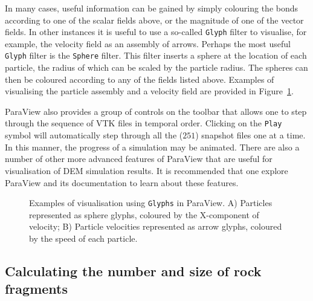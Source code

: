 In many cases, useful information can be gained by simply colouring the bonds according to one of the scalar fields above, or the magnitude of one of the vector fields. In other instances it is useful to use a so-called \texttt{Glyph} filter to visualise, for example, the velocity field as an assembly of arrows. Perhaps the most useful \texttt{Glyph} filter is the \texttt{Sphere} filter. This filter inserts a sphere at the location of each particle, the radius of which can be scaled by the particle radius. The spheres can then be coloured according to any of the fields listed above. Examples of visualising the particle assembly and a velocity field are provided in Figure~\ref{fig:PV_examples}.

ParaView also provides a group of controls on the toolbar that allows one to step through the sequence of VTK files in temporal order. Clicking on the \texttt{Play} symbol will automatically step through all the ($251$) snapshot files one at a time. In this manner, the progress of a simulation may be animated. There are also a number of other more advanced features of ParaView that are useful for visualisation of DEM simulation results. It is recommended that one explore ParaView and its documentation to learn about these features.

\begin{figure}
\caption{Examples of visualisation using \texttt{Glyphs} in ParaView. A) Particles represented as sphere glyphs, coloured by the X-component of velocity; B) Particle velocities represented as arrow glyphs, coloured by the speed of each particle.}
\label{fig:PV_examples}
\end{figure}

\subsection{Calculating the number and size of rock fragments}

